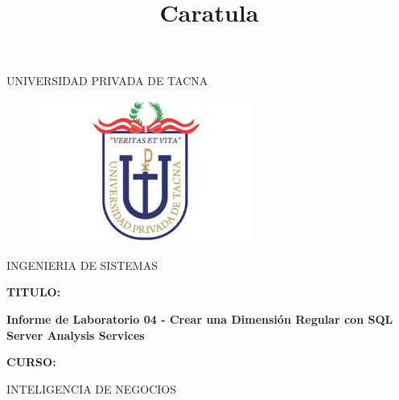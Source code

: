 \documentclass[12pt,letterpaper]{article}
\begin{document}
%


\title{Caratula}

\begin{titlepage}
\begin{center}
\large{UNIVERSIDAD PRIVADA DE TACNA}\\
\vspace*{-0.025in}
\begin{figure}[htb]
\begin{center}
\includegraphics[width=7cm]{./images/logo}
\end{center}
\end{figure}
\vspace*{0.15in}
INGENIERIA DE SISTEMAS  \\

\vspace*{0.3in}
\begin{large}
\textbf{TITULO:} \\
\end{large}

\vspace*{0.1in}
\begin{Large}
\textbf{Informe de Laboratorio 04 -  Crear una Dimensión Regular con SQL
Server Analysis Services} \\

\end{Large}

\vspace*{0.3in}
\begin{Large}
\textbf{CURSO:} \\
\end{Large}

\vspace*{0.1in}
\begin{large}
INTELIGENCIA DE NEGOCIOS\\
\end{large}


\end{center}
\end{titlepage}
\end{document}
